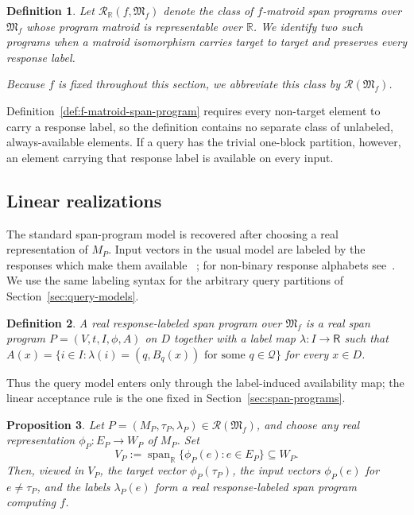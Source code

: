\documentclass[11pt]{article}
\numberwithin{equation}{section}
\newtheorem{definition}{Definition}[section]
\newtheorem{proposition}[definition]{Proposition}
\theoremstyle{remark}
\begin{document}
\begin{definition}
\label{def:representable-matroid-span-program-class}
Let $\mathscr R_{\mathbb R}(f,\mathfrak M_f)$ denote the class of $f$-matroid span programs over $\mathfrak M_f$ whose program matroid is representable over $\mathbb R$. We identify two such programs when a matroid isomorphism carries target to target and preserves every response label.

Because $f$ is fixed throughout this section, we abbreviate this class by $\mathscr R(\mathfrak M_f)$.
\end{definition}

Definition~\ref{def:f-matroid-span-program} requires every non-target element
to carry a response label, so the definition contains no separate class of
unlabeled, always-available elements. If a query has the trivial one-block
partition, however, an element carrying that response label is available on
every input.


\subsection{Linear realizations}
\label{subsec:matroid-span-linear-realizations}

The standard span-program model is recovered after choosing a real
representation of $M_P$. Input vectors in the usual model are labeled by
the responses which make them available
~\cite{KarchmerWigderson1993,Reichardt2009}; for non-binary response
alphabets see~\cite{BeigiTaghavi2019}. We use the same labeling syntax for
the arbitrary query partitions of Section~\ref{sec:query-models}.

\begin{definition}
\label{def:response-labeled-span-program}
A \emph{real response-labeled span program over $\mathfrak M_f$} is a real span program $P=(V,t,I,\phi,A)$ on $D$ together with a label map $\lambda:I\to\mathsf R$ such that $A(x)=\{i\in I:\lambda(i)=(q,B_q(x))\text{ for some }q\in\mathcal Q\}$ for every $x\in D$.
\end{definition}

Thus the query model enters only through the label-induced availability map; the linear acceptance rule is the one fixed in Section~\ref{sec:span-programs}.

\begin{proposition}
\label{prop:matroid-program-to-linear-span-program}
Let
$P=(M_P,\tau_P,\lambda_P)\in\mathscr R(\mathfrak M_f)$, and choose any real
representation $\phi_P:E_P\to W_P$ of $M_P$. Set
\begin{equation}
    V_P:=\operatorname{span}_{\mathbb R}\{\phi_P(e):e\in E_P\}\subseteq W_P.
\end{equation}
Then, viewed in $V_P$, the target vector $\phi_P(\tau_P)$, the input vectors
$\phi_P(e)$ for $e\neq\tau_P$, and the labels $\lambda_P(e)$ form a real
response-labeled span program computing $f$.
\end{proposition}
\end{document}
